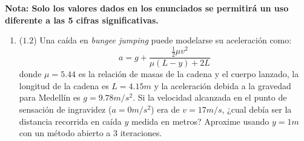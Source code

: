 \documentclass[12pt]{article}
\begin{document}
\textbf{Nota: Solo los valores dados en los enunciados se permitirá un uso diferente a las 5 cifras significativas.}
\vspace{-.5cm}
  \begin{enumerate}[leftmargin=*,widest=9]
     \item (\(1.2\)) Una caída en \textit{bungee jumping} puede modelarse su aceleración como:
\begin{equation*}
a = g + \frac{\frac{1}{2}\mu v^2}{\mu (L-y) + 2L}
\end{equation*}
donde \(\mu=5.44\) es la relación de masas de la cadena y el cuerpo lanzado, la longitud de la cadena es \(L = 4.15m\) y la aceleración debida a la gravedad para Medellín es \(g=9.78m/s^2\). Si la velocidad alcanzada en el punto de sensación de ingravidez (\(a=0m/s^2\)) era de \(v=17m/s\), ¿cual debía ser la distancia recorrida en caída \(y\) medida en metros? Aproxime usando \(y=1m\) con un método abierto a 3 iteraciones.


\end{enumerate}
\end{document}
